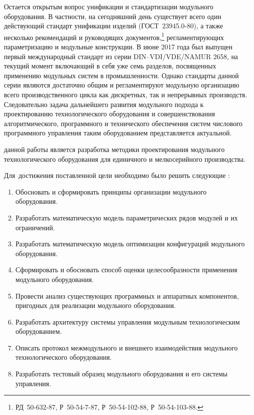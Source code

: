 Остается открытым вопрос унификации и стандартизации модульного оборудования. В частности, на сегодняшний день существует всего один действующий стандарт унификации изделий (ГОСТ~23945.0-80), а также несколько рекомендаций и руководящих документов,\footnote{РД~50-632-87, Р~50-54-7-87, Р~50-54-102-88, Р~50-54-103-88.} регламентирующих параметризацию и модульные конструкции. В июне 2017 года был выпущен первый международный стандарт из серии DIN--VDI/VDE/NAMUR 2658, на текущий момент включающий в себя уже семь разделов, посвященных применению модульных систем в промышленности. Однако стандарты данной серии являются достаточно общим и регламентируют модульную организацию всего производственного цикла как дискретных, так и непрерывных производств. Следовательно задача дальнейшего развития модульного подхода к проектированию технологического оборудования и совершенствования алгоритмического, программного и технического обеспечения систем числового программного управления таким оборудованием представляется актуальной.  


{\aim} данной работы является разработка методики проектирования модульного технологического оборудования для единичного и мелкосерийного производства.

Для~достижения поставленной цели необходимо было решить следующие {\tasks}:
\begin{enumerate}[beginpenalty=10000] %
  \item Обосновать и сформировать принципы организации модульного оборудования.
  \item Разработать математическую модель параметрических рядов модулей и их ограничений.
  \item Разработать математическую модель оптимизации конфигураций модульного оборудования.
  \item Сформировать и обосновать способ оценки целесообразности применения модульного оборудования.
  \item Провести анализ существующих программных и аппаратных компонентов, пригодных для реализации модульного оборудования.
  \item Разработать архитектуру системы управления модульным технологическим оборудованием.
  \item Описать протокол межмодульного и внешнего взаимодействия модульного технологического оборудования.
  \item Разработать тестовый образец модульного оборудования и его системы управления.
\end{enumerate}



